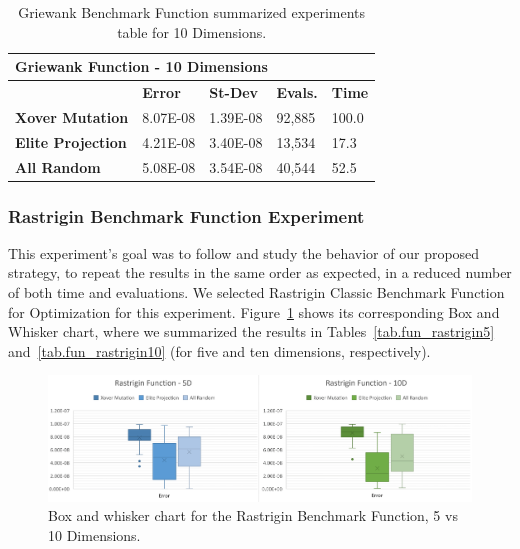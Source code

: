\documentclass[graybox]{svmult}
\begin{document}
            \begin{table}[]
                \scriptsize
                \centering
                \caption{Griewank Benchmark Function summarized experiments table for 10 Dimensions.}\label{tab.fun_griewank10}
                \begin{tabular}{@{}lllll@{}}
                \toprule
                \multicolumn{5}{l}{\textbf{Griewank Function - 10 Dimensions}} \\ \midrule
                & \textbf{Error} & \textbf{St-Dev} & \textbf{Evals.} & \textbf{Time} \\
                \textbf{Xover Mutation} & 8.07E-08 & 1.39E-08 & 92,885 & 100.0 \\
                \textbf{Elite Projection} & 4.21E-08 & 3.40E-08 & 13,534 & 17.3 \\
                \textbf{All Random} & 5.08E-08 & 3.54E-08 & 40,544 & 52.5 \\ \bottomrule
                \end{tabular}
                \end{table}

            \FloatBarrier


        \subsubsection{Rastrigin Benchmark Function Experiment}

            This experiment's goal was to follow and study the behavior of our
            proposed strategy, to repeat the results in the same order as
            expected, in a reduced number of both time and evaluations. We
            selected Rastrigin Classic Benchmark Function for Optimization for
            this experiment. Figure~\ref{fig.fun_rastrigin} shows its
            corresponding Box and Whisker chart, where we summarized the
            results in Tables~\ref{tab.fun_rastrigin5} and~\ref{tab.fun_rastrigin10} 
            (for five and ten dimensions, respectively).

            \begin{figure}
                \includegraphics[width=0.99\linewidth, frame]{img/fig_fun_rastrigin.pdf}
                \caption{Box and whisker chart for the Rastrigin Benchmark Function, 5 vs 10 Dimensions.} \label{fig.fun_rastrigin}
                \end{figure}
\end{document}
